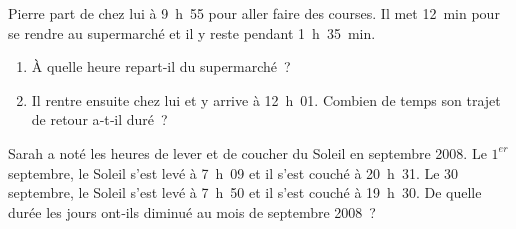 \begin{exercice}
Pierre part de chez lui à 9 h 55 pour aller faire des courses. Il met 12 min pour se rendre au supermarché et il y reste pendant 1 h 35 min.
\begin{enumerate} 
 \item À quelle heure repart‑il du supermarché ?
 \item Il rentre ensuite chez lui et y arrive à 12 h 01. Combien de temps son trajet de retour a‑t‑il duré ?
 \end{enumerate}
\end{exercice}


\begin{exercice}
Sarah a noté les heures de lever et de coucher du Soleil en septembre 2008. Le $1^{er}$ septembre, le Soleil s'est levé à 7 h 09 et il s'est couché à 20 h 31. Le 30 septembre, le Soleil s'est levé à 7 h 50 et il s'est couché à 19 h 30. De quelle durée les jours ont‑ils diminué au mois de septembre 2008 ?
\end{exercice}
 